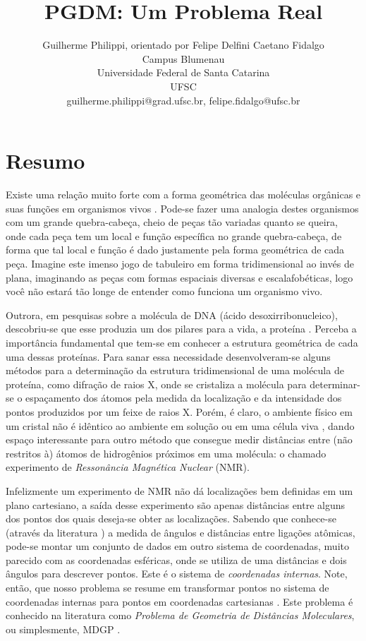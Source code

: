 \documentclass[a4paper,12pt]{article}
\title{PGDM: Um Problema Real}
\author{Guilherme Philippi\Mark{*}, orientado por Felipe Delfini Caetano Fidalgo\Mark{\dagger}\\Campus Blumenau\\Universidade Federal de Santa Catarina\\UFSC
\\guilherme.philippi@grad.ufsc.br\Mark{*}, felipe.fidalgo@ufsc.br\Mark{\dagger}}
\begin{document}
	\maketitle
	
	\section*{Resumo}
	
	Existe uma relação muito forte com a forma geométrica das moléculas orgânicas e suas funções em organismos vivos \cite{bioquimicaLehninger}. Pode-se fazer uma analogia destes organismos com um grande quebra-cabeça, cheio de peças tão variadas quanto se queira, onde cada peça tem um local e função específica no grande quebra-cabeça, de forma que tal local e função é dado justamente pela forma geométrica de cada peça. Imagine este imenso jogo de tabuleiro em forma tridimensional ao invés de plana, imaginando as peças com formas espaciais diversas e escalafobéticas, logo você não estará tão longe de entender como funciona um organismo vivo.
	
	Outrora, em pesquisas sobre a molécula de DNA (ácido desoxirribonucleico), descobriu-se que esse produzia um dos pilares para a vida, a proteína \cite{fidalgotese}. Perceba a importância fundamental que tem-se em conhecer a estrutura geométrica de cada uma dessas proteínas. Para sanar essa necessidade desenvolveram-se alguns métodos para a determinação da estrutura tridimensional de uma molécula de proteína, como difração de raios X, onde se cristaliza a molécula para determinar-se o espaçamento dos átomos pela medida da localização e da intensidade dos pontos produzidos por um feixe de raios X. Porém, é claro, o ambiente físico em um cristal não é idêntico ao ambiente em solução ou em uma célula viva \cite{bioquimicaLehninger}, dando espaço interessante para outro método que consegue medir distâncias entre (não restritos à) átomos de hidrogênios próximos em uma molécula: o chamado experimento de \textit{Ressonância Magnética Nuclear} (NMR).
	
	Infelizmente um experimento de NMR não dá localizações bem definidas em um plano cartesiano, a saída desse experimento são apenas distâncias entre alguns dos pontos dos quais deseja-se obter as localizações. Sabendo que conhece-se (através da literatura \cite{crippen:DistancesAndMolecularConformation}) a medida de ângulos e distâncias entre ligações atômicas, pode-se montar um conjunto de dados em outro sistema de coordenadas, muito parecido com as coordenadas esféricas, onde se utiliza de uma distâncias e dois ângulos para descrever pontos. Este é o sistema de \textit{coordenadas internas}. Note, então, que nosso problema se resume em transformar pontos no sistema de coordenadas internas para pontos em coordenadas cartesianas \cite{carlileBook31Coloquio}. Este problema é conhecido na literatura como \textit{Problema de Geometria de Distâncias Moleculares}, ou simplesmente, MDGP \cite{carlileGDandAplications}. 
	
\end{document}
